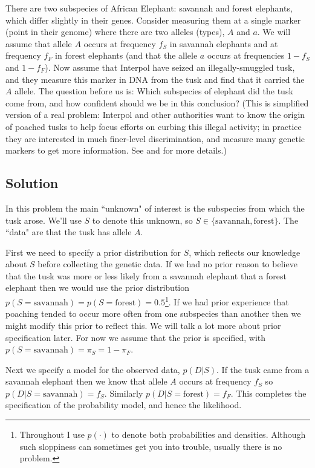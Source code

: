 \documentclass[times,11pt]{article}
\def\s{\mbox{savannah}}
\def\f{\mbox{forest}}
\def\ffA{f_F}
\def\fsA{f_S}
\def\pif{\pi_F}
\def\pis{\pi_S}
\begin{document}
There are two subspecies of African Elephant: savannah and forest elephants, which differ slightly in their genes. Consider measuring them at a single marker (point in their genome) where there are two alleles (types), $A$ and $a$. We will assume that allele $A$ occurs at frequency $\fsA$ in savannah elephants 
and at frequency $\ffA$ in forest elephants (and that the allele $a$ occurs at frequencies $1-\fsA$ and $1-\ffA$). Now assume that Interpol have seized an illegally-smuggled tusk, and they measure this marker in DNA from the tusk and find that it carried the $A$ allele. The question before us is: Which subspecies of elephant did the tusk come from, and how confident should we be in this conclusion? (This is simplified version of a real problem: Interpol and other authorities want to know the origin of poached tusks to help focus efforts on curbing this illegal activity; in practice they are interested in much finer-level discrimination, and measure many genetic markers to get more information. See
\cite{wasser.etal.07} and \cite{wasser.etal.08}
for more details.)


\subsection*{Solution}

In this problem the main ``unknown" of interest is the subspecies from which the tusk arose. We'll use $S$ to denote this unknown, so $S \in \{\s,\f\}$. The ``data" are that the tusk has allele $A$.

First we need to specify a prior distribution for $S$, which reflects our knowledge about $S$ before collecting the genetic data. If we had no prior reason to believe that the tusk was more or less likely from a savannah elephant that a forest elephant then we would use the prior distribution $p(S=\s) = p(S=\f) = 0.5$\footnote{Throughout I use $p(\cdot)$ to denote both probabilities and densities. Although such sloppiness can sometimes get you into trouble, usually there is no problem.}. If we had prior experience that poaching tended to occur more often from one subspecies than another then we might modify this prior to reflect this. We will talk a lot more about prior specification later. For now we assume that the prior is specified, with $p(S=\s)= \pis = 1-\pif$.

Next we specify a model for the observed data, $p(D|S)$.
If the tusk came from a savannah elephant then we know that allele $A$ occurs at frequency $\fsA$ so $p(D | S=\s) = \fsA$. Similarly $p(D | S=\f) = \ffA$. This completes the specification of the probability model, and hence the likelihood.
\end{document}
